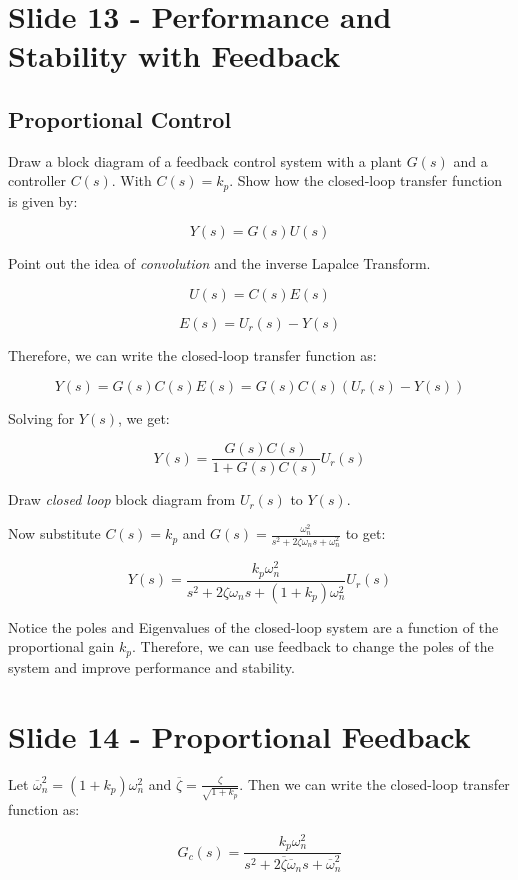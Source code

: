 \documentclass[
  letterpaper,
  DIV=11,
  numbers=noendperiod]{scrreprt}
\begin{document}
\section{Slide 13 - Performance and Stability with
Feedback}\label{slide-13---performance-and-stability-with-feedback}

\subsection{Proportional Control}\label{proportional-control}

Draw a block diagram of a feedback control system with a plant \(G(s)\)
and a controller \(C(s)\). With \(C(s) = k_p\). Show how the closed-loop
transfer function is given by:

\[Y(s) = G(s)U(s)\]

Point out the idea of \emph{convolution} and the inverse Lapalce
Transform.

\[U(s) = C(s)E(s)\]

\[E(s) = U_r(s) - Y(s)\]

Therefore, we can write the closed-loop transfer function as:

\[Y(s) = G(s)C(s)E(s) = G(s)C(s)(U_r(s) - Y(s))\]

Solving for \(Y(s)\), we get:

\[Y(s) = \frac{G(s)C(s)}{1 + G(s)C(s)}U_r(s)\]

Draw \emph{closed loop} block diagram from \(U_r(s)\) to \(Y(s)\).

Now substitute \(C(s) = k_p\) and
\(G(s) = \frac{\omega_n^2}{s^2 + 2\zeta\omega_n s + \omega_n^2}\) to
get:

\[Y(s) = \frac{k_p\omega_n^2}{s^2 + 2\zeta\omega_n s + (1+k_p)\omega_n^2}U_r(s)\]

Notice the poles and Eigenvalues of the closed-loop system are a
function of the proportional gain \(k_p\). Therefore, we can use
feedback to change the poles of the system and improve performance and
stability.

\section{Slide 14 - Proportional
Feedback}\label{slide-14---proportional-feedback}

Let \(\overline{\omega}_n^2 = (1+k_p)\omega_n^2\) and
\(\overline{\zeta} = \frac{\zeta}{\sqrt{1+k_p}}\). Then we can write the
closed-loop transfer function as:

\[G_c(s) = \frac{k_p\omega_n^2}{s^2 + 2\overline{\zeta}\overline{\omega}_n s + \overline{\omega}_n^2}\]
\end{document}
